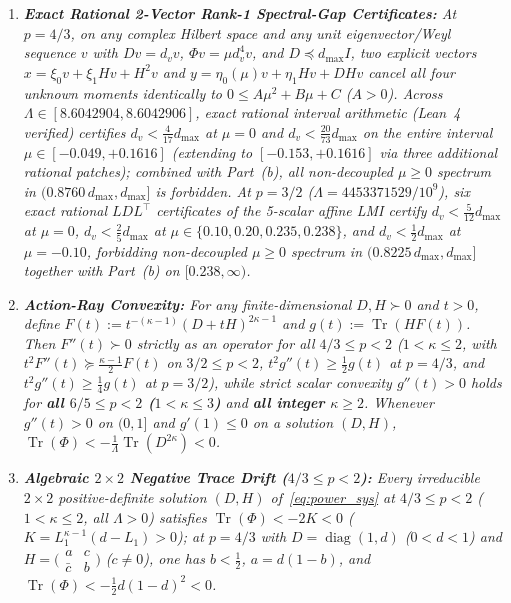 \documentclass[10pt,letterpaper]{article}
\newcommand{\Tr}{\operatorname{Tr}}
\newcommand{\diag}{\operatorname{diag}}
\begin{document}
\begin{tcolorbox}[mathbox]
\begin{enumerate}[label=(\alph*),leftmargin=1.8em,itemsep=2pt,topsep=2pt]
  \item \emph{\textbf{Exact Rational 2-Vector Rank-1 Spectral-Gap Certificates:} At $p = 4/3$, on any complex Hilbert space and any unit eigenvector/Weyl sequence $v$ with $Dv = d_v v$, $\Phi v = \mu d_v^4 v$, and $D \preceq d_{\max} I$, two explicit vectors $x = \xi_0 v + \xi_1 H v + H^2 v$ and $y = \eta_0(\mu) v + \eta_1 H v + D H v$ cancel all four unknown moments identically to $0 \le A\mu^2 + B\mu + C$ ($A > 0$). Across $\Lambda \in [8.6042904, 8.6042906]$, exact rational interval arithmetic (Lean~4 verified) certifies $d_v < \frac{4}{17} d_{\max}$ at $\mu = 0$ and $d_v < \frac{20}{73} d_{\max}$ on the entire interval $\mu \in [-0.049, +0.1616]$ (extending to $[-0.153, +0.1616]$ via three additional rational patches); combined with Part~(b), all non-decoupled $\mu \ge 0$ spectrum in $(0.8760\,d_{\max}, d_{\max}]$ is forbidden. At $p = 3/2$ ($\Lambda = 4453371529/10^9$), six exact rational $LDL^\top$ certificates of the 5-scalar affine LMI certify $d_v < \frac{5}{12} d_{\max}$ at $\mu = 0$, $d_v < \frac{2}{5} d_{\max}$ at $\mu \in \{0.10, 0.20, 0.235, 0.238\}$, and $d_v < \frac{1}{2} d_{\max}$ at $\mu = -0.10$, forbidding non-decoupled $\mu \ge 0$ spectrum in $(0.8225\,d_{\max}, d_{\max}]$ together with Part~(b) on $[0.238, \infty)$.}
  \item \emph{\textbf{Action-Ray Convexity:} For any finite-dimensional $D, H \succ 0$ and $t > 0$, define $F(t) := t^{-(\kappa-1)}(D+tH)^{2\kappa-1}$ and $g(t) := \Tr(H F(t))$. Then $F''(t) \succ 0$ strictly as an operator for all $4/3 \le p < 2$ ($1 < \kappa \le 2$, with $t^2 F''(t) \succeq \frac{\kappa-1}{2} F(t)$ on $3/2 \le p < 2$, $t^2 g''(t) \ge \frac{1}{2} g(t)$ at $p = 4/3$, and $t^2 g''(t) \ge \frac{1}{4} g(t)$ at $p = 3/2$), while strict scalar convexity $g''(t) > 0$ holds for \textbf{all $6/5 \le p < 2$ ($1 < \kappa \le 3$)} and \textbf{all integer $\kappa \ge 2$}. Whenever $g''(t) > 0$ on $(0, 1]$ and $g'(1) \le 0$ on a solution $(D, H)$, $\Tr(\Phi) < -\frac{1}{\Lambda}\Tr(D^{2\kappa}) < 0$.}
  \item \emph{\textbf{Algebraic $2\times 2$ Negative Trace Drift ($4/3 \le p < 2$):} Every irreducible $2\times 2$ positive-definite solution $(D, H)$ of~\eqref{eq:power_sys} at $4/3 \le p < 2$ ($1 < \kappa \le 2$, all $\Lambda > 0$) satisfies $\Tr(\Phi) < -2K < 0$ ($K = L_1^{\kappa-1}(d - L_1) > 0$); at $p = 4/3$ with $D = \diag(1, d)$ ($0 < d < 1$) and $H = \bigl(\begin{smallmatrix} a & c \\ \bar{c} & b \end{smallmatrix}\bigr)$ ($c \neq 0$), one has $b < \frac{1}{2}$, $a = d(1-b)$, and $\Tr(\Phi) < -\frac{1}{2} d(1 - d)^2 < 0$.}
\end{enumerate}
\end{tcolorbox}
\end{document}
